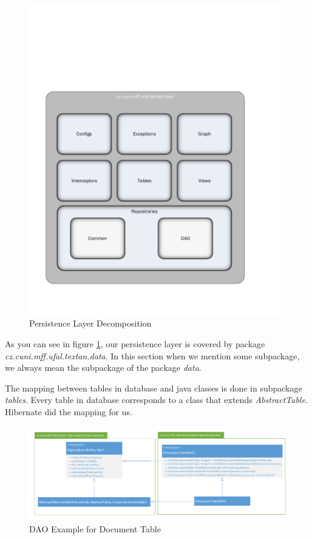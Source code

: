 \begin{figure}[!htb]
        \centering
        \includegraphics[width=\textwidth]{Images/DataDecomposition}
        \caption{Persistence Layer Decomposition}
        \label{fig:DataDecomposition}
\end{figure}

As you can see in figure \ref{fig:DataDecomposition}, our persistence layer is
covered by package \emph{cz.cuni.mff.ufal.textan.data}. In this section when we
mention some subpackage, we always mean the subpackage of the package \emph{data}.

The mapping between tables in database and java classes is done in subpackage
\emph{tables}. Every table in database corresponds to a class that extends
\emph{AbstractTable}. Hibernate did the mapping for us. 

\begin{figure}[!htb]
        \centering
        \includegraphics[width=\textwidth]{Images/DatabaseDAO}
        \caption{DAO Example for Document Table}
        \label{fig:DatabaseDAO}
\end{figure}

